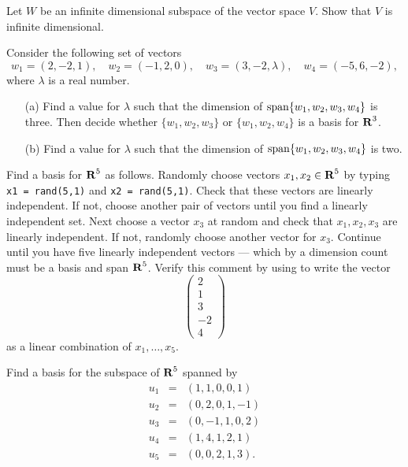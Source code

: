 \begin{exercise}  \label{c5.6.3A}
Let $W$ be an infinite dimensional subspace of the vector space $V$.
Show that $V$ is infinite dimensional.
\end{exercise}


\CEXER

\begin{exercise} \label{c5.6.4}
Consider the following set of vectors
\[
w_1 = (2, -2, 1), \quad
w_2 = (-1, 2, 0), \quad
w_3 = (3, -2, \lambda), \quad
w_4 = (-5, 6, -2),
\]
where $\lambda$ is a real number.
\begin{itemize}
\item[(a)] Find a value for $\lambda$ such that the
dimension of ${\rm span}\{w_1,w_2,w_3,w_4\}$ is three. Then decide
whether $\{w_1,w_2,w_3\}$ or $\{w_1,w_2,w_4\}$ is a basis for
$\mbox{$\bf{R}$}^3$.
\item[(b)] Find a value for $\lambda$ such that the
dimension of ${\rm span}\{w_1,w_2,w_3,w_4\}$ is two.
\end{itemize}
\end{exercise}

\begin{exercise} \label{c5.6.5}
Find a basis for $\mbox{$\bf{R}$}^5$ as follows.  Randomly choose vectors $x_1,x_2\in\mbox{$\bf{R}$}^5$
by typing {\tt x1 = rand(5,1)} and {\tt x2 = rand(5,1)}.  Check that these
vectors are linearly independent.  If not, choose another pair of vectors
until you find a linearly independent set.  Next choose a vector $x_3$ at
random and check that $x_1,x_2,x_3$ are linearly independent.  If not,
randomly choose another vector for $x_3$. Continue until you have five
linearly independent vectors --- which by a dimension count must be a
basis and span $\mbox{$\bf{R}$}^5$.  Verify this comment by using \Matlab
to write the vector
\[
\left(\begin{array}{r} 2 \\ 1 \\ 3\\ -2 \\ 4 \end{array}\right)
\]
as a linear combination of $x_1,\ldots,x_5$.
\end{exercise}

\begin{exercise} \label{c5.6.6}
Find a basis for the subspace of $\mbox{$\bf{R}$}^5$ spanned by
\begin{equation*}
\begin{array}{rcl}
u_1 & = & (1,1,0,0,1) \\
u_2 & = & (0,2,0,1,-1)  \\
u_3 & = & (0,-1,1,0,2)   \\
u_4 & = & (1,4,1,2,1)  \\
u_5 & = & (0,0,2,1,3).
\end{array}
\end{equation*}
\end{exercise}


